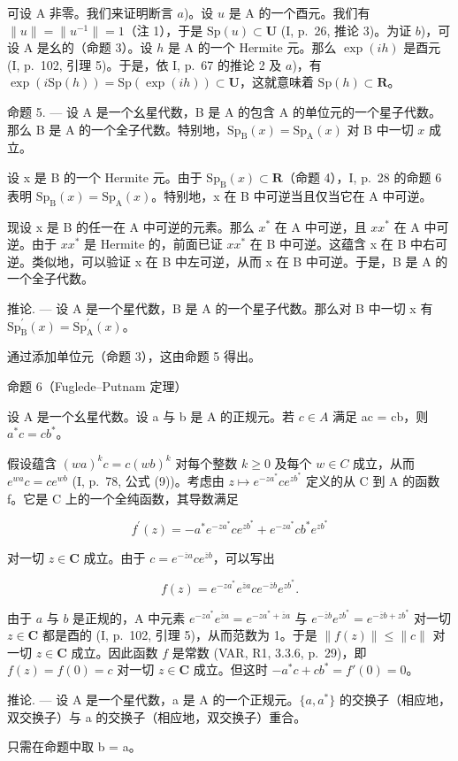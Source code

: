 可设 A 非零。我们来证明断言 \(a\))。设 \(u\) 是 A 的一个酉元。我们有 \(\|u\|=\|u^{-1}\|=1\)（注 1），于是 \(\mathrm{Sp}(u)\subset\mathbf{U}\) (I, p.~26, 推论 3)。为证 \(b\))，可设 A 是幺的（命题 3）。设 \(h\) 是 A 的一个 Hermite 元。那么 \(\exp(ih)\) 是酉元 (I, p.~102, 引理 5)。于是，依 I, p.~67 的推论 2 及 \(a\))，有 \(\exp(i\mathrm{Sp}(h))=\mathrm{Sp}(\exp(ih))\subset\mathbf{U}\)，这就意味着 \(\mathrm{Sp}(h)\subset\mathbf{R}\)。

命题 5. — 设 A 是一个幺星代数，B 是 A 的包含 A 的单位元的一个星子代数。那么 B 是 A 的一个全子代数。特别地，\(\mathrm{Sp}_{\mathrm{B}}(x) = \mathrm{Sp}_{\mathrm{A}}(x)\) 对 B 中一切 \(x\) 成立。

设 x 是 B 的一个 Hermite 元。由于 \(\mathrm{Sp}_{\mathrm{B}}(x) \subset \mathbf{R}\)（命题 4），I, p.~28 的命题 6 表明 \(\mathrm{Sp}_{\mathrm{B}}(x) = \mathrm{Sp}_{\mathrm{A}}(x)\)。特别地，x 在 B 中可逆当且仅当它在 A 中可逆。

现设 x 是 B 的任一在 A 中可逆的元素。那么 \(x^{*}\) 在 A 中可逆，且 \(xx^{*}\) 在 A 中可逆。由于 \(xx^{*}\) 是 Hermite 的，前面已证 \(xx^{*}\) 在 B 中可逆。这蕴含 x 在 B 中右可逆。类似地，可以验证 x 在 B 中左可逆，从而 x 在 B 中可逆。于是，B 是 A 的一个全子代数。

推论. --- 设 A 是一个星代数，B 是 A 的一个星子代数。那么对 B 中一切 x 有 \(\mathrm{Sp}_{\mathrm{B}}^{\prime}(x)=\mathrm{Sp}_{\mathrm{A}}^{\prime}(x)\)。

通过添加单位元（命题 3），这由命题 5 得出。

命题 6（Fuglede–Putnam 定理）

设 A 是一个幺星代数。设 a 与 b 是 A 的正规元。若 \(c \in A\) 满足 ac = cb，则 \(a^{*}c = cb^{*}\)。

假设蕴含 \((wa)^{k}c = c(wb)^{k}\) 对每个整数 \(k \geqslant 0\) 及每个 \(w \in C\) 成立，从而 \(e^{wa}c = ce^{wb}\) (I, p.~78, 公式 (9))。考虑由 \(z \mapsto e^{-za^{*}}ce^{zb^{*}}\) 定义的从 C 到 A 的函数 f。它是 C 上的一个全纯函数，其导数满足

\[
f ^ {\prime} (z) = - a ^ {*} e ^ {- z a ^ {*}} c e ^ {z b ^ {*}} + e ^ {- z a ^ {*}} c b ^ {*} e ^ {z b ^ {*}}
\]

对一切 \(z \in \mathbf{C}\) 成立。由于 \(c = e^{-\overline{z}a} ce^{\overline{z}b}\)，可以写出

\[
f (z) = e ^ {- z a ^ {*}} e ^ {\overline {{z}} a} c e ^ {- \overline {{z}} b} e ^ {z b ^ {*}}.
\]

由于 \(a\) 与 \(b\) 是正规的，A 中元素 \(e^{-za^*}e^{\overline{z} a} = e^{-za^* + \overline{z} a}\) 与 \(e^{-\overline{z} b}e^{zb^*} = e^{-\overline{z} b + zb^*}\) 对一切 \(z\in \mathbf{C}\) 都是酉的 (I, p.~102, 引理 5)，从而范数为 1。于是 \(\| f(z)\| \leqslant \| c\|\) 对一切 \(z\in \mathbf{C}\) 成立。因此函数 \(f\) 是常数 (VAR, R1, 3.3.6, p.~29)，即 \(f(z) = f(0) = c\) 对一切 \(z\in \mathbf{C}\) 成立。但这时 \(-a^{*}c + cb^{*} = f'(0) = 0\)。

推论. --- 设 A 是一个星代数，a 是 A 的一个正规元。\(\{a, a^{*}\}\) 的交换子（相应地，双交换子）与 a 的交换子（相应地，双交换子）重合。

只需在命题中取 b = a。

